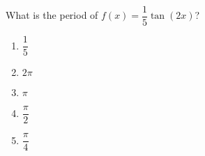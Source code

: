 
\bigskip

\item What is the period of $f(x) = \dfrac{1}{5}\tan(2x)$?
	
	\begin{enumerate}
		\item $\dfrac{1}{5}$
		\item $2\pi$
		\item $\pi$
		\item $\dfrac{\pi}{2}$
		\item $\dfrac{\pi}{4}$
	\end{enumerate}
	

